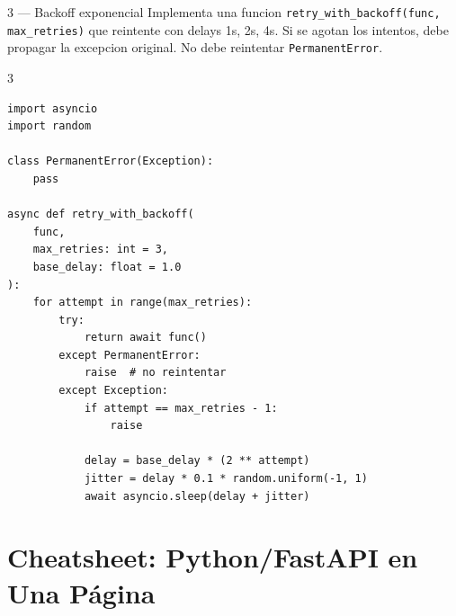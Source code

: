 \documentclass[11pt,a4paper]{article}
\begin{document}
\begin{ejerciciobox}{3 — Backoff exponencial}
Implementa una funcion \texttt{retry\_with\_backoff(func, max\_retries)}
que reintente con delays 1s, 2s, 4s. Si se agotan los intentos, debe
propagar la excepcion original. No debe reintentar \texttt{PermanentError}.
\end{ejerciciobox}

\begin{solucionbox}{3}
\begin{lstlisting}[style=python]
import asyncio
import random

class PermanentError(Exception):
    pass

async def retry_with_backoff(
    func,
    max_retries: int = 3,
    base_delay: float = 1.0
):
    for attempt in range(max_retries):
        try:
            return await func()
        except PermanentError:
            raise  # no reintentar
        except Exception:
            if attempt == max_retries - 1:
                raise

            delay = base_delay * (2 ** attempt)
            jitter = delay * 0.1 * random.uniform(-1, 1)
            await asyncio.sleep(delay + jitter)
\end{lstlisting}
\end{solucionbox}

\newpage
\section{Cheatsheet: Python/FastAPI en Una Página}
\end{document}
